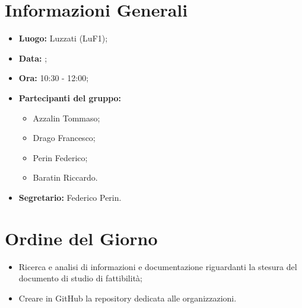 \section{Informazioni Generali}
\begin{itemize}
\item \textbf{Luogo:} Luzzati (LuF1);
\item \textbf{Data:} \Data;
\item \textbf{Ora:} 10:30 - 12:00;
\item \textbf{Partecipanti del gruppo:}
	\begin{itemize}
	\item Azzalin Tommaso; 
	\item Drago Francesco;
	\item Perin Federico;
	\item Baratin Riccardo.
	\end{itemize} 
\item \textbf{Segretario:} Federico Perin.
\end{itemize}

\clearpage

\section{Ordine del Giorno}
\begin{itemize}
\item Ricerca e analisi di informazioni e documentazione riguardanti la stesura del documento di studio di fattibilità;
\item Creare in GitHub la repository dedicata alle organizzazioni.
\end{itemize}

\clearpage

